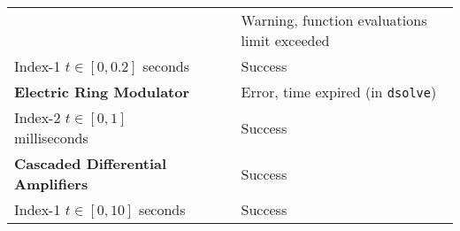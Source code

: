 {\begin{longtable}{lccl}
    & \Maple{}  & \mycheckmark{}\mywarnmark{} & Warning, function evaluations limit exceeded \\ \cmidrule(l{4pt}){2-4}
    Index-1 \quad $t \in [0, 0.2]$ seconds & \Indigo{} & \mycheckmark{}\phantom{\mywarnmark{}} & Success \\ \midrule
  \multirow{1}{*}{\textbf{Electric Ring Modulator~\cite{lioen1998test, mazzia2008test}}}
    & \Maple{}  & \mycrossmark{}\phantom{\mywarnmark{}} & Error, time expired (in \texttt{dsolve}) \\ \cmidrule(l{4pt}){2-4}
    Index-2 \quad $t \in [0, 1]$ milliseconds & \Indigo{} & \mycheckmark{}\phantom{\mywarnmark{}} & Success \\ \midrule
  \multirow{1}{*}{\textbf{Cascaded Differential Amplifiers~\cite{brenan1995numerical}}}
    & \Maple{}  & \mycheckmark{}\phantom{\mywarnmark{}} & Success \\ \cmidrule(l{4pt}){2-4}
    Index-1 \quad $t \in [0, 10]$ seconds & \Indigo{} & \mycheckmark{}\phantom{\mywarnmark{}} & Success \\
  \bottomrule
\end{longtable}}